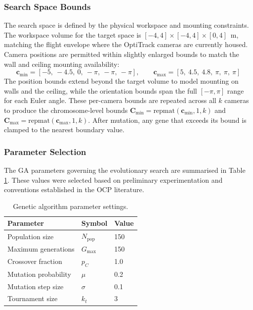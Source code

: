 \subsubsection{Search Space Bounds}

The search space is defined by the physical workspace and mounting constraints. The workspace volume for the target space is $[-4, 4] \times [-4, 4] \times [0, 4]$~m, matching the flight envelope where the OptiTrack cameras are currently housed. Camera positions are permitted within slightly enlarged bounds to match the wall and ceiling mounting availability:
%
\begin{equation}
\label{eq:bounds}
\mathbf{c}_{\min} = [-5,\ -4.5,\ 0,\ -\pi,\ -\pi,\ -\pi], \qquad
\mathbf{c}_{\max} = [5,\ 4.5,\ 4.8,\ \pi,\ \pi,\ \pi]
\end{equation}
%
The position bounds extend beyond the target volume to model mounting on walls and the ceiling, while the orientation bounds span the full $[-\pi, \pi]$ range for each Euler angle. These per-camera bounds are repeated across all $k$ cameras to produce the chromosome-level bounds $\mathbf{C}_{\min} = \text{repmat}(\mathbf{c}_{\min}, 1, k)$ and $\mathbf{C}_{\max} = \text{repmat}(\mathbf{c}_{\max}, 1, k)$. After mutation, any gene that exceeds its bound is clamped to the nearest boundary value.

\subsubsection{Parameter Selection}
\label{sec:param-selection}

The GA parameters governing the evolutionary search are summarised in Table \ref{tab:ga-params}. These values were selected based on preliminary experimentation and conventions established in the \gls{OCP} literature.

\begin{table}[htbp]
\centering
\caption{Genetic algorithm parameter settings.}
\label{tab:ga-params}
\begin{tabular}{l l l}
\toprule
\textbf{Parameter} & \textbf{Symbol} & \textbf{Value} \\
\midrule
Population size & $N_{\text{pop}}$ & 150 \\
Maximum generations & $G_{\max}$ & 150 \\
Crossover fraction & $p_C$ & 1.0 \\
Mutation probability & $\mu$ & 0.2 \\
Mutation step size & $\sigma$ & 0.1 \\
Tournament size & $k_t$ & 3 \\
\bottomrule
\end{tabular}
\end{table}

